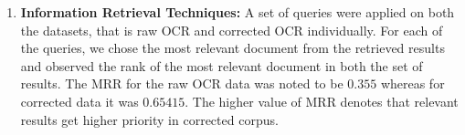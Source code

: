 \documentclass{acm_proc_article-sp}
\begin{document}
\begin{enumerate}
\item \textbf{Information Retrieval Techniques: }%
A set of queries were applied on both the datasets, that is raw OCR and corrected OCR individually. For each of the queries, we chose the most relevant document from the retrieved results and observed the rank of the most relevant document in both the set of results. The MRR for the raw OCR data was noted to be $0.355$ whereas for corrected data it was $0.65415$. The higher value of MRR denotes that relevant results get higher priority in corrected corpus.
\end{enumerate}

%

%
%
%
%
%
\end{document}
